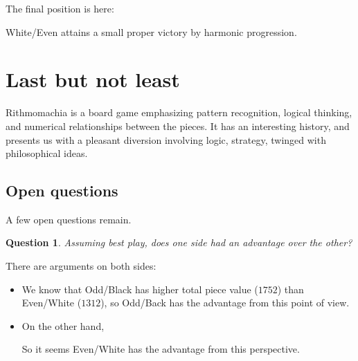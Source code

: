 \documentclass[14pt]{extarticle}
\newtheorem{question}{Question}
\begin{document}
The final position is here:
\begin{center}
\end{center}

White/Even attains a small proper victory by harmonic progression.

\section{Last but not least}


Rithmomachia is a board game emphasizing pattern recognition,
logical thinking, and numerical relationships between the pieces.
It has an interesting history, and presents us with
a pleasant diversion involving logic, strategy, twinged with philosophical
ideas.

\subsection{Open questions}

A few open questions remain.

\begin{question}
Assuming best play, does one side had an advantage over the other?
\end{question}  

There are arguments on both sides:
\begin{itemize}
\item  
We know that Odd/Black has higher total piece value ($1752$)
than Even/White ($1312$), so Odd/Back has the advantage from this
point of view.
\item
  On the other hand,
So it seems Even/White has the advantage from this perspective.
\end{itemize}
\end{document}
